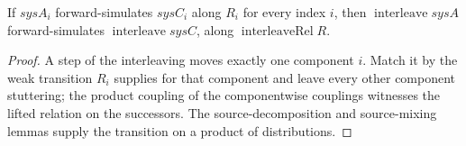 \begin{theorem}
  \label{thm:precong-interleave}
  \leanok
  If $sysA_i$ forward-simulates $sysC_i$ along $R_i$ for every index $i$, then $\operatorname{interleave} sysA$ forward-simulates $\operatorname{interleave} sysC$, along $\operatorname{interleaveRel} R$.
\end{theorem}

\begin{proof}\leanok
  A step of the interleaving moves exactly one component $i$.
  Match it by the weak transition $R_i$ supplies for that component and leave every other component stuttering; the product coupling of the componentwise couplings witnesses the lifted relation on the successors.
  The source-decomposition and source-mixing lemmas supply the transition on a product of distributions.
\end{proof}
